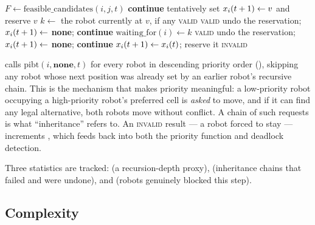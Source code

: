 \begin{algorithm}[H]
\caption{}
\label{alg:pibt}
\begin{algorithmic}[1]
\State $F \gets \mathrm{feasible\_candidates}(i, j, t)$
   \textbf{continue} \EndIf
  \State tentatively set $x_{i}(t+1) \gets v$ and reserve $v$
  \State $k \gets$ the robot currently at $v$, if any
    \Return \textsc{valid} 
  \EndIf
      \Return \textsc{valid} 
    \Else
      \State undo the reservation; $x_{i}(t+1) \gets$ \textbf{none}; \textbf{continue}
    \EndIf
  \EndIf
  \State $\mathrm{waiting\_for}(i) \gets k$
    \Return \textsc{valid} 
  \EndIf
  \State undo the reservation; $x_{i}(t+1) \gets$ \textbf{none}; \textbf{continue}
\EndFor
\State $x_{i}(t+1) \gets x_{i}(t)$; reserve it
\Return \textsc{invalid} 
\end{algorithmic}
\end{algorithm}

 calls $\mathrm{pibt}(i, \textbf{none}, t)$ for every robot in
descending priority order (), skipping any robot whose next
position was already set by an earlier robot's recursive chain. This is the
mechanism that makes priority meaningful: a low-priority robot occupying a
high-priority robot's preferred cell is \emph{asked} to move, and if it can find
any legal alternative, both robots move without conflict. A chain of such
requests is what ``inheritance'' refers to. An \textsc{invalid} result --- a
robot forced to stay --- increments , which feeds back into
both the priority function and deadlock detection.

Three statistics are tracked:  (a recursion-depth
proxy),  (inheritance chains that failed and were undone), and
 (robots genuinely blocked this step).

\subsection{Complexity}
\label{sec:pibt-complexity}

